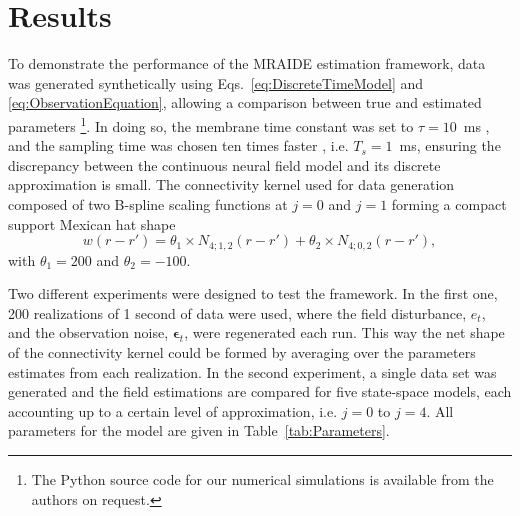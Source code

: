 \documentclass[review,authoryear,3p]{elsarticle}
\begin{document}
\section{Results}\label{sec:MRA-results}
To demonstrate the performance of the MRAIDE estimation framework, data was generated synthetically  using Eqs.~\eqref{eq:DiscreteTimeModel} and \eqref{eq:ObservationEquation}, allowing a comparison between true and estimated parameters \footnote{The Python source code for our numerical simulations is available from the authors on request.}. In doing so, the membrane time constant was set to $\tau = 10$~ms \citep{David2003}, and the sampling time was chosen ten times faster \citep{Stephan2008}, i.e. $T_s = 1$~ms, ensuring the discrepancy between the continuous neural field model and its discrete approximation is small. The connectivity kernel used for data generation composed of two B-spline scaling functions at $j=0$ and $j=1$ forming a compact support Mexican hat shape 
\begin{equation}\label{eq:ConnectivityKernelForData}
	w(r-r')=\theta_1\times N_{4;1,2}(r-r')+\theta_2\times N_{4;0,2}(r-r'),
\end{equation}
with $\theta_1=200$ and $\theta_2=-100$. 

Two different experiments were designed to test the framework. In the first one, 200 realizations of 1 second of data were used, where the field disturbance, $e_t$, and the observation noise, $\boldsymbol\epsilon_t$, were regenerated each run. This way the net shape of the connectivity kernel could be formed by averaging over the parameters estimates from each realization. In the second experiment, a single data set was generated and the field estimations are compared for five state-space models, each accounting up to a certain level of approximation, i.e. $j=0$ to $j=4$. All parameters for the model are given in Table~\ref{tab:Parameters}.
\end{document}
